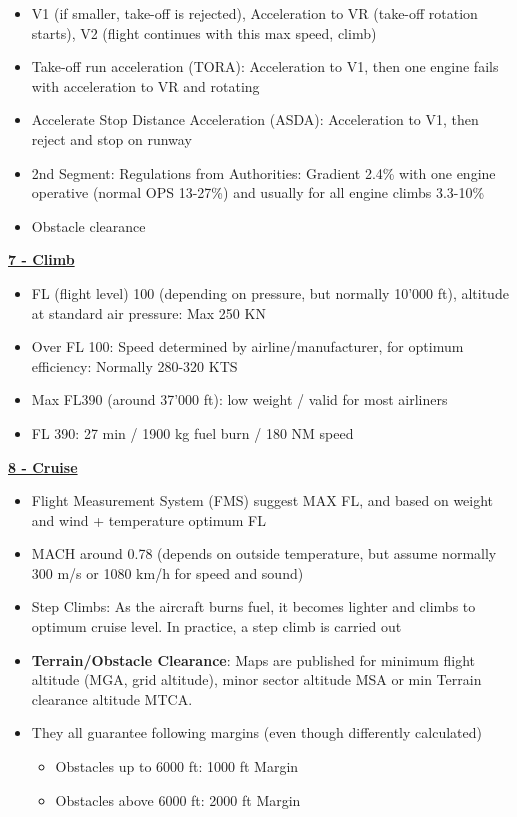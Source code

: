 \documentclass[9pt, landscape, fleqn]{scrartcl}
\begin{document}
\begin{multicols*}{3}
\begin{itemize}
    \item V1 (if smaller, take-off is rejected), Acceleration to VR (take-off rotation starts), V2 (flight continues with this max speed, climb)
    \item Take-off run acceleration (TORA): Acceleration to V1, then one engine fails with acceleration to VR and rotating 
    \item Accelerate Stop Distance Acceleration (ASDA): Acceleration to V1, then reject and stop on runway 
    \item 2nd Segment: Regulations from Authorities: Gradient 2.4\% with one engine operative (normal OPS 13-27\%) and usually for all engine climbs 3.3-10\%
    \item Obstacle clearance
\end{itemize}
\underline{\textbf{7 - Climb}}
\begin{itemize}
    \item FL (flight level) 100 (depending on pressure, but normally 10'000 ft), altitude at standard air pressure: Max 250 KN 
    \item Over FL 100: Speed determined by airline/manufacturer, for optimum efficiency: Normally 280-320 KTS 
    \item Max FL390 (around 37'000 ft): low weight / valid for most airliners 
    \item FL 390: 27 min / 1900 kg fuel burn / 180 NM speed
\end{itemize}
\underline{\textbf{8 - Cruise}}
\begin{itemize}
    \item Flight Measurement System (FMS) suggest MAX FL, and based on weight and wind + temperature optimum FL 
    \item MACH around 0.78 (depends on outside temperature, but assume normally 300 m/s or 1080 km/h for speed and sound)
    \item Step Climbs: As the aircraft burns fuel, it becomes lighter and climbs to optimum cruise level. In practice, a step climb is carried out  
    \item \textbf{Terrain/Obstacle Clearance}: Maps are published for minimum flight altitude (MGA, grid altitude), minor sector altitude MSA or min Terrain clearance altitude MTCA.
    \item They all guarantee following margins (even though differently calculated)
    \begin{itemize}
        \item Obstacles up to 6000 ft: 1000 ft Margin 
        \item Obstacles above 6000 ft: 2000 ft Margin 

\end{itemize}
\end{itemize}
\end{multicols*}
\end{document}
